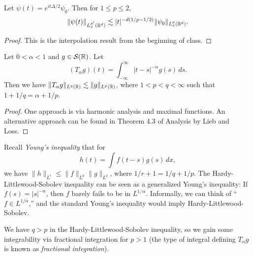 \begin{lemma}\label{lem:decay}
  Let $\psi(t) = e^{it \Delta / 2} \psi_0$.
  Then for $1 \le p \le 2$,
  \[
    \|\psi(t) \|_{L^{p'}_x(\mathbb{R}^d)}
    \lesssim |t|^{-d (1 / p - 1 / 2)} \|\psi_0\|_{L^p_x(\mathbb{R}^d)}.
  \]
\end{lemma}

\begin{proof}
  This is the interpolation result from the beginning
  of class.
\end{proof}

\begin{lemma}\label{lem:hardy-littlewood-sobolev}
  Let $0 < \alpha < 1$ and $g \in \mathcal{S}(\mathbb{R})$.
  Let
  \[
    (T_\alpha g)(t) = \int_{-\infty}^\infty |t - s|^{-\alpha} g(s)\, ds.
  \]
  Then we have
  $\|T_\alpha g\|_{L^q(\mathbb{R})} \lesssim \|g\|_{L^p(\mathbb{R})}$,
  where $1 < p < q < \infty$ such that
  $1 + 1 / q = \alpha + 1 / p$.
\end{lemma}

\begin{proof}
  One approach is via harmonic analysis and maximal
  functions. An alternative approach can be found in
  Theorem 4.3 of Analysis by Lieb and Loss.
\end{proof}

\begin{remark}
  Recall \emph{Young's inequality} that for
  \[
    h(t) = \int f(t - s) g(s)\, dx,
  \]
  we have $\|h\|_{L^r} \le \|f\|_{L^p} \|g\|_{L^q}$,
  where $1 / r + 1 = 1 / q + 1 / p$. The
  Hardy-Littlewood-Sobolev inequality can be
  seen as a generalized Young's inequality: If
  $f(s) = |s|^{-\alpha}$, then $f$ barely fails to be
  in $L^{1 / \alpha}$. Informally, we can think of
  ``$f \in L^{1 / \alpha}$,'' and the standard
  Young's inequality would imply
  Hardy-Littlewood-Sobolev.
\end{remark}

\begin{remark}
  We have $q > p$ in the Hardy-Littlewood-Sobolev
  inequality, so we gain some integrability via
  fractional integration for $p > 1$
  (the type of integral defining
  $T_\alpha g$ is known as \emph{fractional integration}).
\end{remark}
